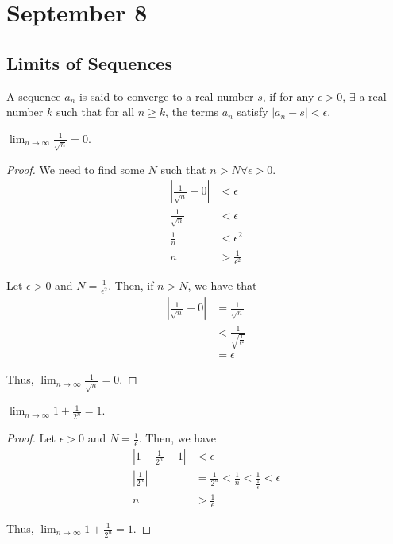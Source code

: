 \section{September 8}

\subsection{Limits of Sequences}
\begin{definition}
    A sequence $a_n$ is said to converge to a real number $s$, if for any $\epsilon > 0$, $\exists$ a real number $k$ such that for all $n \geq k$, the terms $a_n$ satisfy $|a_n - s| < \epsilon$.
\end{definition}

\begin{theorem}
    $\lim_{n \to \infty} \frac{1}{\sqrt{n}} = 0$.
\end{theorem}
\begin{proof}
    We need to find some $N$ such that $n > N \forall \epsilon > 0$.
    \begin{align*}
        | \frac{1}{\sqrt{n}} - 0 | &< \epsilon \\
        \frac{1}{\sqrt{n}} &< \epsilon \\
        \frac{1}{n} &< \epsilon^2 \\
        n &> \frac{1}{\epsilon^2}
    \end{align*}
    
    Let $\epsilon > 0$ and $N = \frac{1}{\epsilon^2}$. Then, if $n > N$, we have that
    \begin{align*}
        | \frac{1}{\sqrt{n}} - 0 | &= \frac{1}{\sqrt{n}} \\
        &< \frac{1}{\sqrt{\frac{1}{\epsilon^2}}} \\
        &= \epsilon
    \end{align*}

    Thus, $\lim_{n \to \infty} \frac{1}{\sqrt{n}} = 0$.
\end{proof}

\begin{theorem}
    $\lim_{n \to \infty} 1 + \frac{1}{2^n} = 1$.
\end{theorem}
\begin{proof}
    Let $\epsilon > 0$ and $N = \frac{1}{\epsilon}$. Then, we have
    \begin{align*}
        | 1 + \frac{1}{2^n} - 1 | &< \epsilon \\
        | \frac{1}{2^n} | &= \frac{1}{2^n} < \frac{1}{n} < \frac{1}{\frac{1}{\epsilon}} < \epsilon \\
        n &> \frac{1}{\epsilon}
    \end{align*}

    Thus, $\lim_{n \to \infty} 1 + \frac{1}{2^n} = 1$.
\end{proof}

